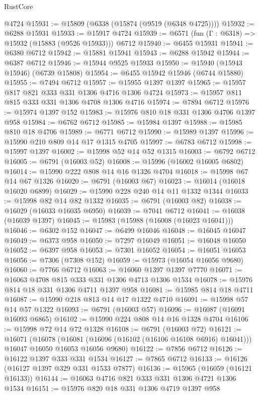 \begin{lexlean}{RustCore}
\begin{coremodule}
    @4724
@15931 := @15809 (@6338 (@15874 (@9519 (@6348 @4725))))
@15932 := @6288 @15931
@15933 := @15917 @4724
@15939 := @6571 (fun (Γ : @6318) => @15932 (@15883 (@9526 @15933))) @6712
@15940 := @6455 @15931
@15941 := @6380 @6712
@15942 := @15881 @15941
@15943 := @6288 @15942
@15944 := @6387 @6712
@15946 := @15944 @9525 @15933
@15950 := @15940 (@15943 @15946) (@6739 @15808)
@15954 := @6455 @15942 @15946 (@6744 @15880)
@15955 := @7494 @6712
@15957 := @15955 @1397 @1397
@15965 := @15957 @817 @821 @333 @331 @1306 @4716 @1306 @4724
@15973 := @15957 @811 @815 @333 @331 @1306 @4708 @1306 @4716
@15974 := @7894 @6712
@15976 := @15974 @1397 @152
@15983 := @15976 @810 @18 @331 @1306 @4706 @1397 @958
@15984 := @6762 @6712
@15985 := @15984 @1397
@15988 := @15985 @810 @18 @4706
@15989 := @6771 @6712
@15990 := @15989 @1397
@15996 := @15990 @210 @809 @14 @17 @1315 @4705
@15997 := @6783 @6712
@15998 := @15997 @1397
@16002 := @15998 @52 @14 @52 @1315
@16003 := @6792 @6712
@16005 := @6791 (@16003 @52)
@16008 := @15996 (@16002 @16005 @6802)
@16014 := @15990 @222 @808 @14 @16 @1326 @4704
@16018 := @15998 @67 @14 @67 @1326
@16020 := @6791 (@16003 @67)
@16023 := @16014 (@16018 @16020 @6899)
@16029 := @15990 @228 @240 @14 @11 @1332 @1344
@16033 := @15998 @82 @14 @82 @1332
@16035 := @6791 (@16003 @82)
@16038 := @16029 (@16033 @16035 @6950)
@16039 := @7041 @6712
@16041 := @16038 (@16039 @1397)
@16045 := @15983 (@15988 (@16008 (@16023 @16041)))
@16046 := @6302 @152
@16047 := @6499 @16046
@16048 := @16045 @16047
@16049 := @6373 @958
@16050 := @7297 @16049
@16051 := @16048 @16050
@16052 := @6397 @958
@16053 := @7301 @16052
@16054 := @16051 @16053
@16056 := @7306 (@7308 @152)
@16059 := @15973 (@16054 @16056 @9680)
@16060 := @7766 @6712
@16063 := @16060 @1397 @1397 @7770
@16071 := @16063 @4708 @815 @333 @331 @1306 @4713 @1306 @1534
@16078 := @15976 @814 @18 @331 @1306 @4711 @1397 @958
@16081 := @15985 @814 @18 @4711
@16087 := @15990 @218 @813 @14 @17 @1322 @4710
@16091 := @15998 @57 @14 @57 @1322
@16093 := @6791 (@16003 @57)
@16096 := @16087 (@16091 @16093 @6865)
@16102 := @15990 @224 @808 @14 @16 @1328 @4704
@16106 := @15998 @72 @14 @72 @1328
@16108 := @6791 (@16003 @72)
@16121 := @16071
    (@16078
      (@16081 (@16096 (@16102 (@16106 @16108 @6916) @16041)))
      @16047
      @16050
      @16053
      @16056
      @9680)
@16122 := @7856 @6712
@16126 := @16122 @1397 @333 @331 @1534
@16127 := @7865 @6712
@16133 := @16126 (@16127 @1397 @329 @331 @1533 @7877)
@16136 := @15965 (@16059 (@16121 @16133))
@16144 := @16063 @4716 @821 @333 @331 @1306 @4721 @1306 @1534
@16151 := @15976 @820 @18 @331 @1306 @4719 @1397 @958

\end{coremodule}
\end{lexlean}

